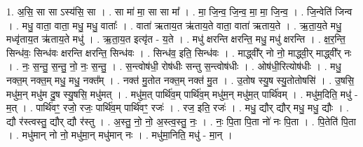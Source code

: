 \documentclass[17pt]{extarticle}
\begin{document}
1. अ॒सि॒ सा सा ऽस्य॑सि॒ सा । . सा मा॑ मा॒ सा सा मा᳚ । . मा॒ जि॒न्व॒ जि॒न्व॒ मा॒ मा॒ जि॒न्व॒ । . जि॒न्वेति॑ जिन्व । . मधु॒ वाता॒ वाता॒ मधु॒ मधु॒ वाताः᳚ । . वाता॑ ऋताय॒त ऋ॑ताय॒ते वाता॒ वाता॑ ऋताय॒ते । . ऋ॒ता॒य॒ते मधु॒ मध्वृ॑ताय॒त ऋ॑ताय॒ते मधु॑ । . ऋ॒ता॒य॒त इत्यृ॑त - य॒ते । . मधु॑ क्षरन्ति क्षरन्ति॒ मधु॒ मधु॑ क्षरन्ति । . क्ष॒र॒न्ति॒ सिन्ध॑वः॒ सिन्ध॑वः क्षरन्ति क्षरन्ति॒ सिन्ध॑वः । . सिन्ध॑व॒ इति॒ सिन्ध॑वः । . माद्ध्वी᳚र् नो नो॒ माद्ध्वी॒र् माद्ध्वी᳚र् नः । . नः॒ स॒न्तु॒ स॒न्तु॒ नो॒ नः॒ स॒न्तु॒ । . स॒न्त्वोष॑धी॒ रोष॑धीः सन्तु स॒न्त्वोष॑धीः । . ओष॑धी॒रित्योष॑धीः । . मधु॒ नक्त॒म् नक्त॒म् मधु॒ मधु॒ नक्त᳚म् । . नक्त॑ मु॒तोत नक्त॒म् नक्त॑ मु॒त । . उ॒तोष स्यु॒ष स्यु॒तोतोषसि॑ । . उ॒षसि॒ मधु॑म॒न् मधु॑म दु॒ष स्यु॒षसि॒ मधु॑मत् । . मधु॑म॒त् पार्थि॑व॒म् पार्थि॑व॒म् मधु॑म॒न् मधु॑म॒त् पार्थि॑वम् । . मधु॑म॒दिति॒ मधु॑ - म॒त् । . पार्थि॑वꣳ॒॒ रजो॒ रजः॒ पार्थि॑व॒म् पार्थि॑वꣳ॒॒ रजः॑ । . रज॒ इति॒ रजः॑ । . मधु॒ द्यौर् द्यौर् मधु॒ मधु॒ द्यौः । . द्यौ र॑स्त्वस्तु॒ द्यौर् द्यौ र॑स्तु । . अ॒स्तु॒ नो॒ नो॒ अ॒स्त्व॒स्तु॒ नः॒ । . नः॒ पि॒ता पि॒ता नो॑ नः पि॒ता । . पि॒तेति॑ पि॒ता । . मधु॑मान् नो नो॒ मधु॑मा॒न् मधु॑मान् नः । . मधु॑मा॒निति॒ मधु॑ - मा॒न् । \newline
\end{document}
